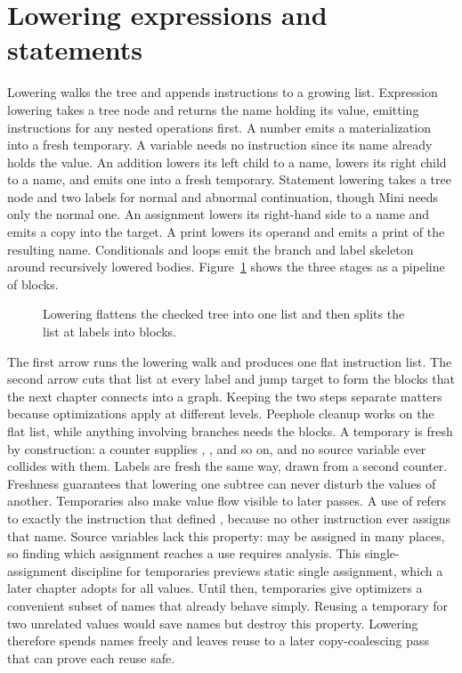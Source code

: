 \section{Lowering expressions and statements}
\label{sec:ch06-lowering}

Lowering walks the tree and appends instructions to a growing list.
Expression lowering takes a tree node and returns the name holding its value, emitting instructions for any nested operations first.
A number emits a materialization into a fresh temporary.
A variable needs no instruction since its name already holds the value.
An addition lowers its left child to a name, lowers its right child to a name, and emits one  into a fresh temporary.
Statement lowering takes a tree node and two labels for normal and abnormal continuation, though Mini needs only the normal one.
An assignment lowers its right-hand side to a name and emits a copy into the target.
A print lowers its operand and emits a print of the resulting name.
Conditionals and loops emit the branch and label skeleton around recursively lowered bodies.
Figure~\ref{fig:ch06-lowering-stages} shows the three stages as a pipeline of blocks.
\begin{figure}
\centering
{}
\caption{Lowering flattens the checked tree into one list and then splits the list at labels into blocks.}
\label{fig:ch06-lowering-stages}
\end{figure}
The first arrow runs the lowering walk and produces one flat instruction list.
The second arrow cuts that list at every label and jump target to form the blocks that the next chapter connects into a graph.
Keeping the two steps separate matters because optimizations apply at different levels.
Peephole cleanup works on the flat list, while anything involving branches needs the blocks.
A temporary is fresh by construction: a counter supplies , , and so on, and no source variable ever collides with them.
Labels are fresh the same way, drawn from a second counter.
Freshness guarantees that lowering one subtree can never disturb the values of another.
Temporaries also make value flow visible to later passes.
A use of  refers to exactly the instruction that defined , because no other instruction ever assigns that name.
Source variables lack this property:  may be assigned in many places, so finding which assignment reaches a use requires analysis.
This single-assignment discipline for temporaries previews static single assignment, which a later chapter adopts for all values.
Until then, temporaries give optimizers a convenient subset of names that already behave simply.
Reusing a temporary for two unrelated values would save names but destroy this property.
Lowering therefore spends names freely and leaves reuse to a later copy-coalescing pass that can prove each reuse safe.

